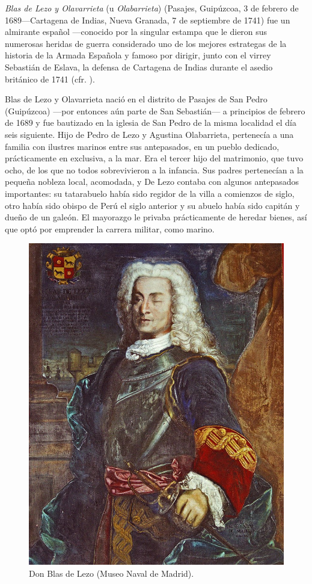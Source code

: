
\textit{Blas de Lezo y Olavarrieta} (u \textit{Olabarrieta})
 (Pasajes, Guipúzcoa, 3 de febrero de
1689---Cartagena de Indias, Nueva Granada, 7 de septiembre de 1741)
fue un almirante español ---conocido por la singular estampa que le
dieron sus numerosas heridas de guerra considerado uno de los mejores
estrategas  de la historia de la Armada
Española y famoso por dirigir, junto con el virrey Sebastián de
Eslava, la defensa de Cartagena de Indias durante el asedio británico
de 1741 (cfr. \cite{bci}).  

Blas de Lezo y Olavarrieta nació en el distrito de Pasajes de San
Pedro (Guipúzcoa) ---por entonces aún parte de San Sebastián--- a
principios de febrero de 1689 y fue bautizado en la iglesia de San
Pedro de la misma localidad el día seis siguiente. Hijo de Pedro de
Lezo y Agustina Olabarrieta, pertenecía a una familia con ilustres
marinos entre sus antepasados, en un pueblo dedicado, prácticamente en
exclusiva, a la mar. Era el tercer hijo del matrimonio, que tuvo ocho,
de los que no todos sobrevivieron a la infancia. Sus padres
pertenecían a la pequeña nobleza local, acomodada, y De Lezo contaba
con algunos antepasados importantes: su tatarabuelo había sido regidor
de la villa a comienzos de siglo, otro había sido obispo de Perú el
siglo anterior y su abuelo había sido capitán y dueño de un galeón. El
mayorazgo le privaba prácticamente de heredar bienes, así que optó por
emprender la carrera militar, como marino.



\begin{figure}[!hbp]
\centering
\includegraphics[width=.35\textwidth]{jpg_Don_Blas_de_Lezo_-Museo_Naval-.jpg}
\caption{\label{fig:donBlas} Don Blas de Lezo (Museo Naval de Madrid).}
\end{figure}

